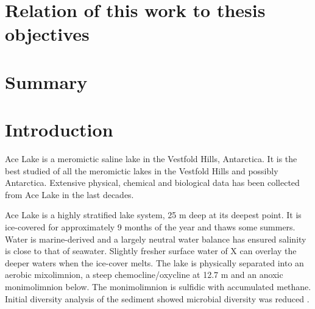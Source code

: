 \section*{Relation of this work to thesis objectives}

\section{Summary}



\section{Introduction}
Ace Lake is a meromictic saline lake in the Vestfold Hills, Antarctica. 
It is the best studied of all the meromictic lakes in the Vestfold Hills and possibly Antarctica.
Extensive physical, chemical and biological data has been collected from Ace Lake in the last decades.

Ace Lake is a highly stratified lake system, 25 m deep at its deepest point.
It is ice-covered for approximately 9 months of the year and thaws some summers. %
Water is marine-derived and a largely neutral water balance has ensured salinity is close to that of seawater.
Slightly fresher surface water of X can overlay the deeper waters when the ice-cover melts.
The lake is physically separated into an aerobic mixolimnion, a steep chemocline/oxycline at 12.7 m and an anoxic monimolimnion below.
The monimolimnion is sulfidic with accumulated methane.
Initial diversity analysis of the sediment showed microbial diversity was reduced \cite{Bowman2000}.

